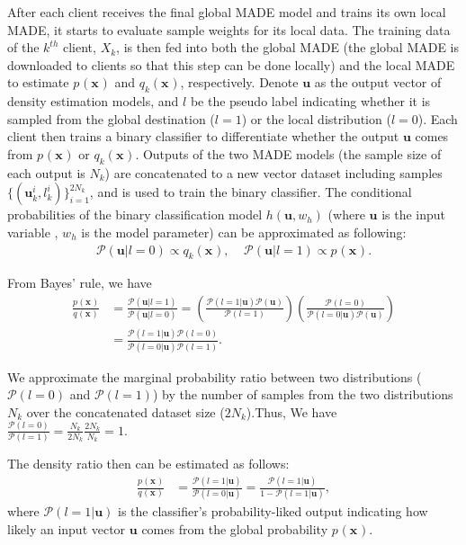 \documentclass[journal]{IEEEtai}
\newcommand{\px}[2]{p_{#1}(\mathbf{x_{#2}})}
\newcommand{\qx}[2]{q_{#1}(\mathbf{x_{#2}})}
\newcommand{\Prob}{\mathcal{P} }
\newcommand{\ubold}{\mathbf{u}}
\begin{document}
After each client receives the final global MADE model and trains its own local MADE, it starts to evaluate sample weights for its local data. The training data of the $k^{th}$ client, $X_k$, is then fed into both the global MADE (the global MADE is downloaded to clients so that this step can be done locally) and the local MADE to estimate $\px{}{}$ and $\qx{k}{}$, respectively. Denote $\ubold{}$ as the output vector of density estimation models, and $l$ be the pseudo label indicating whether it is sampled from the global destination ($l=1$) or the local distribution ($l=0$). Each client then trains a binary classifier to differentiate whether the output $\ubold$ comes from $\px{}{}$ or $\qx{k}{}$. Outputs of the two MADE models (the sample size of each output is $N_k$) are concatenated to a new vector dataset including samples $\{(\ubold{}_k^i,l_k^i) \}_{i=1}^{2N_k}$, and is used to train the binary classifier. The conditional probabilities of the binary classification model $h(\ubold,w_h)$ (where $\ubold$ is the input variable , $w_h$ is the model parameter) can be approximated as following: 
\begin{align}
	\Prob(\ubold | l=0 )  \propto  \qx{k}{}  ,\;\;\;\;
    \Prob(\ubold | l=1 )  \propto \px{}{}.
\end{align}

From Bayes' rule, we have
\small
\begin{align}
	\frac{\px{}{}}{\qx{}{}} &= \frac{\Prob(\ubold | l=1 )}{ \Prob(\ubold | l=0 ) }       
	= \left( \frac{\Prob(l=1| \ubold ) \Prob(\ubold)}{\Prob(l=1)} \right)     
	\left( \frac{\Prob(l=0)} {\Prob(l=0| \ubold ) \Prob(\ubold)}\right)  \label{eq:pq1}\\
	 &= \frac{  \Prob(l=1|\ubold )  \Prob(l=0) }{ \Prob(l=0|\ubold )  \Prob(l=1)  }.  \label{eq:pq2} 
\end{align}

We approximate the marginal probability ratio between two distributions ( $\Prob(l=0)$  and $\Prob(l=1)$) by the number of samples from the two distributions $N_k$ over the concatenated dataset size ($2N_k$).Thus,  We have
 	$\frac{ \Prob(l=0) }{ \Prob(l=1)  } = \frac{N_k}{2N_k} \frac{2N_k}{N_k}=1. \label{eq:marginalratio}$

The density ratio then can be estimated as follows:
\begin{align}
\frac{\px{}{}}{\qx{}{}} &= \frac{  \Prob(l=1|\ubold )  }{ \Prob(l=0|\ubold )   } 
	= \frac{  \Prob(l=1|\ubold )  }{ 1 - \Prob(l=1|\ubold )   } ,\label{eq:ratio2}
\end{align} 
where $\Prob(l=1|\ubold{})$ is the classifier's probability-liked output indicating how likely an input vector $\ubold$ comes from the global probability $\px{}{}$. 
 
\end{document}
